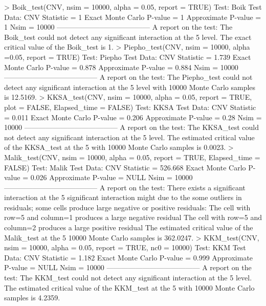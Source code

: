 \begin{example}
	> Boik_test(CNV, nsim = 10000, alpha = 0.05, report = TRUE)
	Test:   Boik Test 
	Data:   CNV 
	Statistic =  1 
	Exact Monte Carlo P-value =  1 
	Approximate P-value =  1 
	Nsim =  10000 
	--------------------------------------- 
	A report on the test:
	The  Boik_test  could not detect any significant interaction at the 5%
	level. The exact critical value of the Boik_test is 1. 
	> Piepho_test(CNV, nsim = 10000, alpha =0.05, report = TRUE)
	Test:   Piepho Test 
	Data:   CNV 
	Statistic =  1.739 
	Exact Monte Carlo P-value =  0.878 
	Approximate P-value =  0.884 
	Nsim =  10000 
	--------------------------------------- 
	 A report on the test:
	 The  Piepho_test  could  not detect any significant interaction at the
	 5%
	 level with 10000 Monte Carlo samples is 12.5169. 
	> KKSA_test(CNV, nsim = 10000, alpha = 0.05, report = TRUE, plot = FALSE,
	Elapsed_time = FALSE)
	Test:   KKSA Test 
	Data:   CNV 
	Statistic =  0.011 
	Exact Monte Carlo P-value =  0.206 
	Approximate P-value =  0.28 
	Nsim =  10000 
	--------------------------------------- 
	 A report on the test:
	 The  KKSA_test  could not detect any significant interaction at the 5%
	 level.  The  estimated critical value of the KKSA_test at the 5%
	 with 10000 Monte Carlo samples is 0.0023. 
	> Malik_test(CNV, nsim = 10000, alpha = 0.05, report = TRUE, Elapsed_time = FALSE)
	Test:   Malik Test 
	Data:   CNV 
	Statistic =  526.668 
	Exact Monte Carlo P-value =  0.026 
	Approximate P-value =  NULL 
	Nsim =  10000 
	--------------------------------------- 
	A report on the test:
	There   exists   a   significant   interaction  at  the  5%
	significant  interaction  might due to the some outliers in residuals;
	some cells produce large negative or positive residuals:
	The cell with row=5 and column=1 produces a large negative residual
	The cell with row=5 and column=2 produces a large positive residual
	The  estimated  critical  value of the Malik_test at the 5%
	10000 Monte Carlo samples is 362.0247.
	> KKM_test(CNV, nsim = 10000, alpha = 0.05, report = TRUE, nc0 = 10000)
	Test:   KKM Test 
	Data:   CNV 
	Statistic =  1.182 
	Exact Monte Carlo P-value =  0.999 
	Approximate P-value =  NULL 
	Nsim =  10000 
	--------------------------------------- 
	 A report on the test:
	 The  KKM_test  could  not detect any significant interaction at the 5%
	 level.  The  estimated  critical value of the KKM_test at the 5%
	 with 10000 Monte Carlo samples is 4.2359. 
\end{example}

